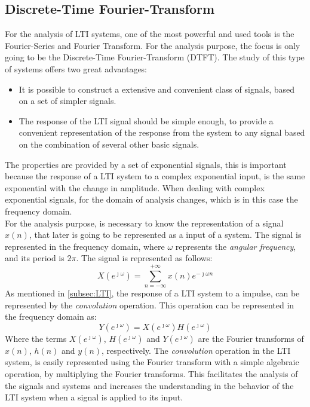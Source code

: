 \subsection{Discrete-Time Fourier-Transform}
For the analysis of LTI systems, one of the most powerful and used tools is the Fourier-Series and Fourier Transform. For the analysis purpose, the focus is only going to be the Discrete-Time Fourier-Transform (DTFT). The study of this type of systems offers two great advantages:
\begin{itemize}
    \item It is possible to construct a extensive and convenient class of signals, based on a set of simpler signals.
    \item The response of the LTI signal should be simple enough, to provide a convenient representation of the response from the system to any signal based on the combination of several other basic signals. 
\end{itemize} 
The properties are provided by a set of exponential signals, this is important because the response of a LTI system to a complex exponential input, is the same exponential with the change in amplitude. When dealing with complex exponential signals, for the domain of analysis changes, which is in this case the frequency domain. \\
For the analysis purpose, is necessary to know the representation of a signal $x(n)$, that later is going to be represented as a input of a system. The signal is represented in the frequency domain, where $\omega$ represents the \textit{angular frequency}, and its period is $2\pi$. The signal is represented as follows:
\begin{equation}
    X(e^{\jmath \omega})=\sum_{n=-\infty}^{+\infty}x(n)e^{-\jmath \omega n}
\end{equation}
As mentioned in \ref{subsec:LTI}, the response of a LTI system to a impulse, can be represented by the \textit{convolution} operation. This operation can be represented in the frequency domain as:
\begin{equation}
    Y(e^{\jmath\omega})= X(e^{\jmath\omega})H(e^{\jmath\omega})
\end{equation}
Where the terms $X(e^{\jmath\omega})$, $H(e^{\jmath\omega})$ and $Y(e^{\jmath\omega})$ are the Fourier transforms of $x(n)$, $h(n)$ and $y(n)$, respectively. The \textit{convolution} operation in the LTI system, is easily represented using the Fourier transform with a simple algebraic operation, by multiplying the Fourier transforms. This facilitates the analysis of the signals and systems and increases the understanding in the behavior of the LTI system when a signal is applied to its input.\\

